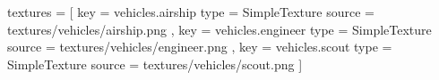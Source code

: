 textures = [
    {
        key         = vehicles.airship
        type        = SimpleTexture
        source      = textures/vehicles/airship.png
    }, {
        key         = vehicles.engineer
        type        = SimpleTexture
        source      = textures/vehicles/engineer.png
    }, {
        key         = vehicles.scout
        type        = SimpleTexture
        source      = textures/vehicles/scout.png
    }
]